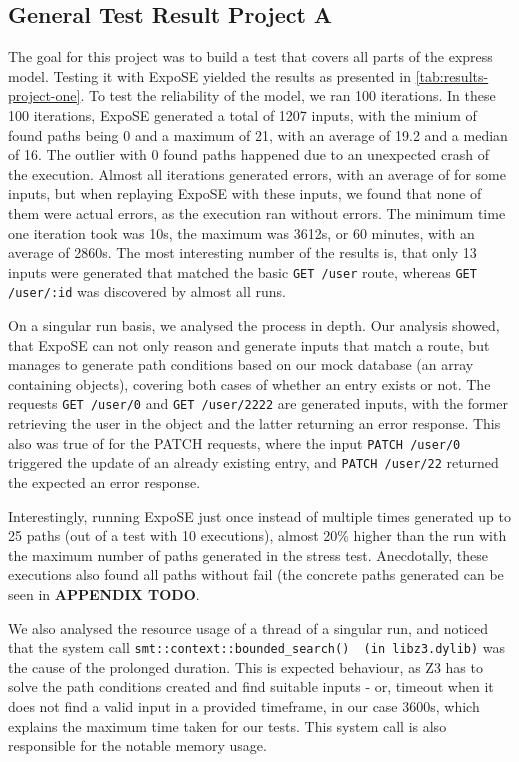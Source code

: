 \subsection{General Test Result Project A}

The goal for this project was to build a test that covers all parts of the express model.
Testing it with ExpoSE yielded the results as presented in \autoref{tab:results-project-one}. 
To test the reliability of the model, we ran 100 iterations.
In these 100 iterations, ExpoSE generated a total of 1207 inputs, with the minium of found paths being 0 and a maximum of 21, with an average of 19.2 and a median of 16. The outlier with 0 found paths happened due to an unexpected crash of the execution. Almost all iterations generated errors, with an average of  for some inputs, but when replaying ExpoSE with these inputs, we found that none of them were actual errors, as the execution ran without errors.
The minimum time one iteration took was 10s, the maximum was 3612s, or 60 minutes, with an average of 2860s.
The most interesting number of the results is, that only 13 inputs were generated that matched the basic \lstinline{GET /user} route, whereas \lstinline{GET /user/:id} was discovered by almost all runs.


On a singular run basis, we analysed the process in depth.
Our analysis showed, that ExpoSE can not only reason and generate inputs that match a route, but manages to generate path conditions based on our mock database (an array containing objects), covering both cases of whether an entry exists or not. The requests \lstinline{GET /user/0} and \lstinline{GET /user/2222} are generated inputs, with the former retrieving the user in the object and the latter returning an error response. This also was true of for the PATCH requests, where the input \lstinline{PATCH /user/0} triggered the update of an already existing entry, and \lstinline{PATCH /user/22} returned the expected an error response.

Interestingly, running ExpoSE just once instead of multiple times generated up to 25 paths (out of a test with 10 executions), almost 20\% higher than the run with the maximum number of paths generated in the stress test. Anecdotally, these executions also found all paths without fail (the concrete paths generated can be seen in \textbf{APPENDIX TODO}.




We also analysed the resource usage of a thread of a singular run, and noticed that the system call \lstinline{smt::context::bounded_search()  (in libz3.dylib)} was the cause of the prolonged duration. This is expected behaviour, as Z3 has to solve the path conditions created and find suitable inputs  - or, timeout when it does not find a valid input in a provided timeframe, in our case 3600s, which explains the maximum time taken for our tests. This system call is also responsible for the notable memory usage.



